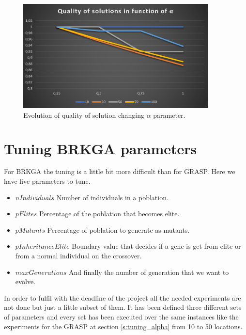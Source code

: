 \documentclass[]{report}
\begin{document}
\begin{figure}
	\caption{Evolution of quality of solution changing $\alpha$ parameter.}
	\label{img:grasp_alfa}
	\centering
	\includegraphics[width=0.9\textwidth]{./imgs/grasp_alfa_comparisons}
\end{figure}



\section{Tuning BRKGA parameters}\label{s:tuning_brkga_params}

For BRKGA the tuning is a little bit more difficult than for GRASP. Here we have five parameters to tune.
\begin{itemize}
	\item $nIndividuals$ Number of individuals in a poblation.
	\item $pElites$ Percentage of the poblation that becomes elite.
	\item $pMutants$ Percentage of poblation to generate as mutants.
	\item $pInheritanceElite$ Boundary value that decides if a gene is get from elite or from a normal individual on the crossover.
	\item $maxGenerations$ And finally the number of generation that we want to evolve.
\end{itemize}

In order to fulfil with the deadline of the project all the needed experiments are not done but just a little subset of them. It has been defined three different sets of parameters and every set has been executed over the same instances like the experiments for the GRASP at section \ref{s:tuning_alpha} from 10 to 50 locations.
\end{document}
